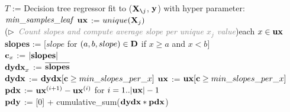 \documentclass{article}
\newcommand{\cut}[1]{}
\newcommand{\Xnj}{${\bf X}_{\texttt{\char`\\} j}$}
\begin{document}
\SetAlgoNoEnd%
\setlength{\algomargin}{5pt}
\begin{algorithm}[H]
\SetAlgoLined
\DontPrintSemicolon
{}
\SetAlgoSkip{}
\small
$T$ := Decision tree regressor fit to (\Xnj{}, $\bf y$) with hyper parameter: ${\it min\_samples\_leaf}$\;
$\bf ux$ := $unique({\bf X}_j)$\\
\For(\hfill$\triangleright$\ {\it\textcolor{gray}{\small Count slopes and compute average slope per unique $x_j$ value}}){each $x \in {\bf ux}$}{
	{\bf slopes} := [$slope$ for $(a,b,slope) \in \bf D$ if $x \ge a$ and $x <b$]\\
	${\bf c}_x$ := $|{\bf slopes}|$\\
	${\bf dydx}_x$ := $\overline{\bf slopes}$\\
}
${\bf dydx}$ := ${\bf dydx}[{\bf c} \ge min\_slopes\_per\_x]$
${\bf ux}$ := ${\bf ux}[{\bf c} \ge min\_slopes\_per\_x]$\\
$\bf pdx$ := ${\bf ux}^{(i+1)} - {\bf ux}^{(i)}$ for $i = 1..|{\bf ux}|-1$\\
$\bf pdy$ := [0] + cumulative\_sum(${\bf dydx} * \bf pdx$)~~~
\label{alg:StratPD}
\end{algorithm}

\cut{
\begin{alltt}
{\fontfamily{cmss}\selectfont\small
{\bf{}CatStratPD}
Fit tree regressor to all but \(x\sb{j}\) with hyper parameter min_slopes_per_x
For each leaf:
    y bar = Group leaf samples by categories of \(x\sb{j}\), computing average y per unique category \(x\sb{j}\)
    Compute unique categories and counts per category
    refcat is randomly chosen category from \(x\sb{j}\)
    For each unique category x in leaf:
        delta[cat,leaf] = Subtract y for refcat from all y bar (refcat delta will be 0)
end
Let Avg[cat] be vector with running sum mapping category to count
work = set of leaf indexes
while more work and something changed and less than max iterations:
    for each leaf in leaves:
        if cat in delta[:,leaf] intersects with Avg:
            j = random category in intersection
            adjust delta[:,leaf] to be relative to j so delta[j,leaf]==0 then add Avg[j] so comparable
            merge into Avg
    work -= all j merged this iteration
}
\end{alltt}
}
\end{document}
